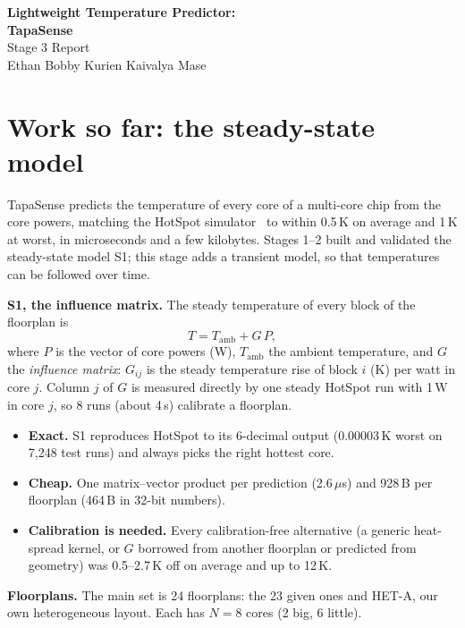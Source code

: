 \documentclass[11pt,a4paper]{article}
\newcommand{\us}{\,$\mu$s}
\begin{document}
\begin{center}
{\LARGE\bfseries Lightweight Temperature Predictor:}\\[4pt]
{\Large\bfseries TapaSense}\\[4pt]
{\large Stage 3 Report}\\[8pt]
Ethan Bobby Kurien \quad Kaivalya Mase
\end{center}

\section{Work so far: the steady-state model}\label{sec:recap}
TapaSense predicts the temperature of every core of a multi-core chip from the core powers,
matching the HotSpot simulator~\cite{hotspot} to within 0.5\,K on average and 1\,K at worst, in
microseconds and a few kilobytes. Stages 1--2 built and validated the steady-state model S1; this
stage adds a transient model, so that temperatures can be followed over time.

\textbf{S1, the influence matrix.} The steady temperature of every block of the floorplan is
\begin{equation}
  T = T_\text{amb} + G\,P,
  \label{eq:s1}
\end{equation}
where $P$ is the vector of core powers (W), $T_\text{amb}$ the ambient temperature, and $G$ the
\emph{influence matrix}: $G_{ij}$ is the steady temperature rise of block $i$ (K) per watt in core
$j$. Column $j$ of $G$ is measured directly by one steady HotSpot run with 1\,W in core $j$, so
8 runs (about 4\,s) calibrate a floorplan.
\begin{itemize}
  \item \textbf{Exact.} S1 reproduces HotSpot to its 6-decimal output (0.00003\,K worst on 7{,}248
        test runs) and always picks the right hottest core.
  \item \textbf{Cheap.} One matrix--vector product per prediction (2.6\us) and 928\,B per
        floorplan (464\,B in 32-bit numbers).
  \item \textbf{Calibration is needed.} Every calibration-free alternative (a generic heat-spread
        kernel, or $G$ borrowed from another floorplan or predicted from geometry) was 0.5--2.7\,K
        off on average and up to 12\,K.
\end{itemize}

\textbf{Floorplans.} The main set is 24 floorplans: the 23 given ones and HET-A, our own
heterogeneous layout. Each has $N = 8$ cores (2 big, 6 little).
\end{document}
